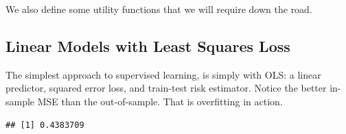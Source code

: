 \documentclass[]{book}
\newenvironment{Shaded}{\begin{snugshade}}{\end{snugshade}}
\newcommand{\KeywordTok}[1]{\textcolor[rgb]{0.13,0.29,0.53}{\textbf{#1}}}
\newcommand{\DataTypeTok}[1]{\textcolor[rgb]{0.13,0.29,0.53}{#1}}
\newcommand{\DecValTok}[1]{\textcolor[rgb]{0.00,0.00,0.81}{#1}}
\newcommand{\StringTok}[1]{\textcolor[rgb]{0.31,0.60,0.02}{#1}}
\newcommand{\CommentTok}[1]{\textcolor[rgb]{0.56,0.35,0.01}{\textit{#1}}}
\newcommand{\ControlFlowTok}[1]{\textcolor[rgb]{0.13,0.29,0.53}{\textbf{#1}}}
\newcommand{\OperatorTok}[1]{\textcolor[rgb]{0.81,0.36,0.00}{\textbf{#1}}}
\newcommand{\NormalTok}[1]{#1}
\theoremstyle{definition}
\theoremstyle{definition}
\theoremstyle{definition}
\theoremstyle{remark}
\begin{document}
We also define some utility functions that we will require down the
road.

\begin{Shaded}
\end{Shaded}

\subsection{Linear Models with Least Squares Loss}\label{least-squares}

The simplest approach to supervised learning, is simply with OLS: a
linear predictor, squared error loss, and train-test risk estimator.
Notice the better in-sample MSE than the out-of-sample. That is
overfitting in action.

\begin{Shaded}
\end{Shaded}

\begin{verbatim}
## [1] 0.4383709
\end{verbatim}

\begin{Shaded}
\end{Shaded}
\end{document}
